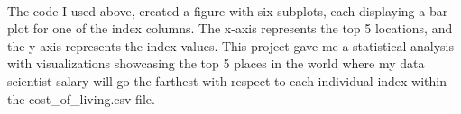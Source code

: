 \documentclass[11pt]{article}
\begin{document}
    \begin{center}
    \end{center}
    { \hspace*{\fill} \\}
    
    The code I used above, created a figure with six subplots, each
displaying a bar plot for one of the index columns. The x-axis
represents the top 5 locations, and the y-axis represents the index
values. This project gave me a statistical analysis with visualizations
showcasing the top 5 places in the world where my data scientist salary
will go the farthest with respect to each individual index within the
cost\_of\_living.csv file.


    
    
    
\end{document}
